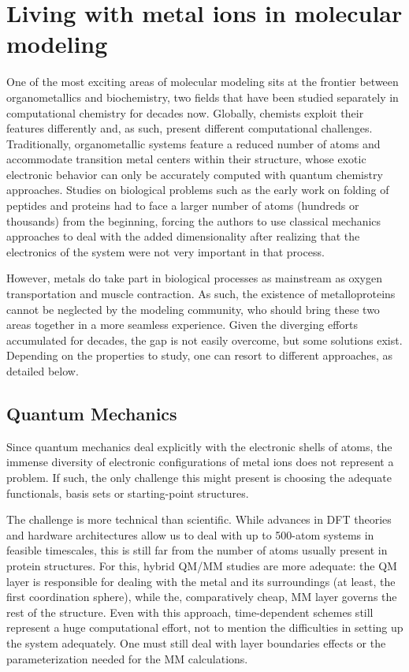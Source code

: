 \chapter{Living with metal ions in molecular modeling}
\label{chap:appendix-c}
One of the most exciting areas of molecular modeling sits at the frontier between organometallics and biochemistry, two fields that have been studied separately in computational chemistry for decades now. Globally, chemists exploit their features differently and, as such, present different computational challenges. Traditionally, organometallic systems feature a reduced number of atoms and accommodate transition metal centers within their structure, whose exotic electronic behavior can only be accurately computed with quantum chemistry approaches. Studies on biological problems such as the early work on folding of peptides and proteins had to face a larger number of atoms (hundreds or thousands) from the beginning, forcing the authors to use classical mechanics approaches to deal with the added dimensionality after realizing that the electronics of the system were not very important in that process.

However, metals do take part in biological processes as mainstream as oxygen transportation and muscle contraction. As such, the existence of metalloproteins cannot be neglected by the modeling community, who should bring these two areas together in a more seamless experience. Given the diverging efforts accumulated for decades, the gap is not easily overcome, but some solutions exist. Depending on the properties to study, one can resort to different approaches, as detailed below.

\section{Quantum Mechanics}
Since quantum mechanics deal explicitly with the electronic shells of atoms, the immense diversity of electronic configurations of metal ions does not represent a problem. If such, the only challenge this might present is choosing the adequate functionals, basis sets or starting-point structures.

The challenge is more technical than scientific. While advances in DFT theories and hardware architectures allow us to deal with up to 500-atom systems in feasible timescales, this is still far from the number of atoms usually present in protein structures. For this, hybrid QM/MM studies are more adequate: the QM layer is responsible for dealing with the metal and its surroundings (at least, the first coordination sphere), while the, comparatively cheap, MM layer governs the rest of the structure. Even with this approach, time-dependent schemes still represent a huge computational effort, not to mention the difficulties in setting up the system adequately. One must still deal with layer boundaries effects or the parameterization needed for the MM calculations.

